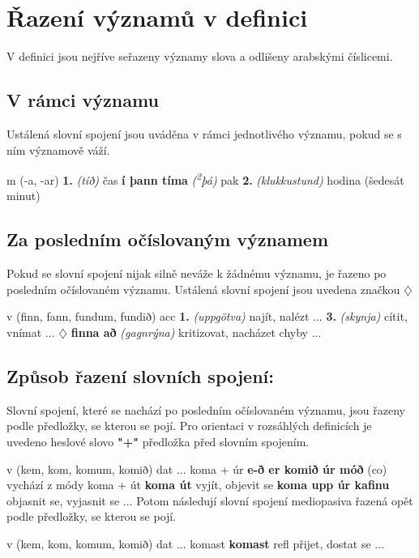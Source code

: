 \section{Řazení významů v definici }
V definici jsou nejříve seřazeny významy slova a odlišeny arabskými číslicemi.

\subsection{V rámci významu}
Ustálená slovní spojení jsou uváděna v rámci jednotlivého významu, pokud se s ním významově váží.   

 {\small{ m (-a, -ar) }
\textbf{1.} \textit{(tíð)} {čas} 
\textbf{í þann tíma} \textit{(\textsuperscript{2}þá)} {pak} 
\textbf{2.} \textit{(klukkustund)} {hodina (šedesát minut)} }

\subsection{Za posledním očíslovaným významem}
Pokud se slovní spojení nijak silně neváže k žádnému významu, je řazeno po posledním očíslovaném významu. Ustálená slovní spojení jsou uvedena značkou {$\diamondsuit$}

 {\small{ v (finn, fann, fundum, fundið) acc }
\textbf{1.} \textit{(uppgötva)} {najít, nalézt} 
...
\textbf{3.} \textit{(skynja)} {cítit, vnímat} 
...
{$\diamondsuit$}
\textbf{finna að} \textit{(gagnrýna)} {kritizovat, nacházet chyby }
...}

\subsection{Způsob řazení slovních spojení:}
Slovní spojení, které se nachází po posledním očíslovaném významu, jsou řazeny podle předložky, se kterou se pojí. Pro orientaci v rozsáhlých definicích je uvedeno heslové slovo \textbf{"+"} předložka před slovním spojením. 

 {\small{ v (kem, kom, komum, komið) dat}
...
{\small{koma + úr}}
\textbf{e-ð er komið úr móð} {(co) vychází z módy}
{\small{koma + út}}
\textbf{koma út} {vyjít, objevit se }
\textbf{koma upp úr kafinu}{ objasnit se, vyjasnit se}
...}
Potom následují slovní spojení mediopasiva řazená opět podle předložky, se kterou se pojí. 

 {\small{ v (kem, kom, komum, komið) dat}
... 	
{\small{komast}}
\textbf{komast} {\small{ refl}} {přijet, dostat se} 
...}

